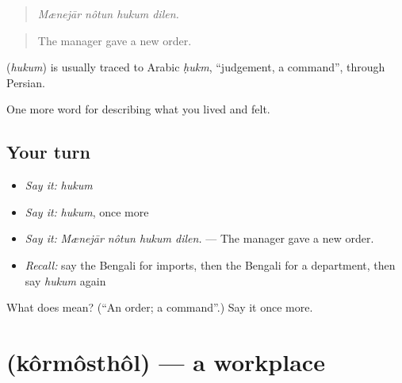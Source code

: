 \begin{quote}
   
\end{quote}

\begin{quote}
\emph{Mænejār nôtun hukum dilen.}
\end{quote}

\begin{quote}
The manager gave a new order.
\end{quote}

\begin{cousinweb}
\textbf{} (\emph{hukum}) is usually traced to Arabic \emph{ḥukm}, \textquotedblleft{}judgement, a command\textquotedblright{}, through Persian.
\end{cousinweb}

\begin{grammarlens}[title={What you've built}]
One more word for describing what you lived and felt.
\end{grammarlens}

\subsection*{Your turn}
\begin{itemize}
\raggedright
  \item \emph{Say it:} \emph{hukum}
  \item \emph{Say it:} \emph{hukum}, once more
  \item \emph{Say it:} \emph{Mænejār nôtun hukum dilen.} — The manager gave a new order.
  \item \emph{Recall:} say the Bengali for imports, then the Bengali for a department, then say \emph{hukum} again
\end{itemize}

\begin{tcolorbox}[breakable,colback=teal!4,colframe=teal!35!black,title={Before you move on}]
What does  mean? (\textquotedblleft{}An order; a command\textquotedblright{}.) Say it once more.
\end{tcolorbox}
\section[\texorpdfstring{\bn{কর্মস্থল} (kôrmôsthôl)}{কর্মস্থল (kôrmôsthôl)}]{ (kôrmôsthôl) — a workplace}

\label{lesson:BN-C500-kormosthol}



